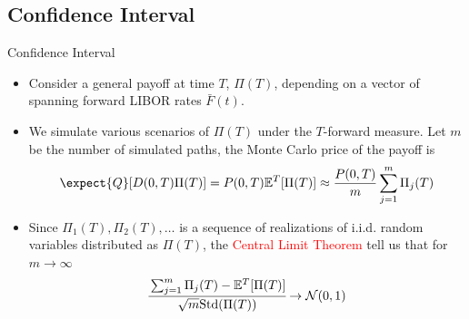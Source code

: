 \documentclass{beamer}
\begin{document}
\subsection{Confidence Interval}
\begin{frame}{Confidence Interval}
  \begin{itemize}
  \item<1-> Consider a general payoff at time $T$, $\Pi(T)$, depending on a vector of spanning forward LIBOR rates $\bar{F}(t)$. %
  \item<2-> We simulate various scenarios of $\Pi(T)$ under the $T$-forward measure. Let $m$ be the number of simulated paths, the Monte Carlo price of the payoff is
    \begin{equation*}
      \expect{Q}[D(0,T)\Pi(T)] = P(0,T)\mathbb{E}^T[\Pi(T)]\approx \frac{P(0,T)}{m}\sum_{j=1}^{m}\Pi_j(T)
    \end{equation*}
  \item<3-> Since $\Pi_1(T), \Pi_2(T),\ldots$ is a sequence of realizations of i.i.d. random variables distributed as $\Pi(T)$, the \textcolor{red}{Central Limit Theorem} tell us that for $m\rightarrow\infty$
    \begin{equation*}
      \cfrac{\sum_{j=1}^{m}\Pi_j(T)-\mathbb{E}^T[\Pi(T)]}{\sqrt{m} \text{Std}(\Pi(T))}\rightarrow \mathcal{N}(0,1)
    \end{equation*}
  \end{itemize}
\end{frame}
\end{document}
